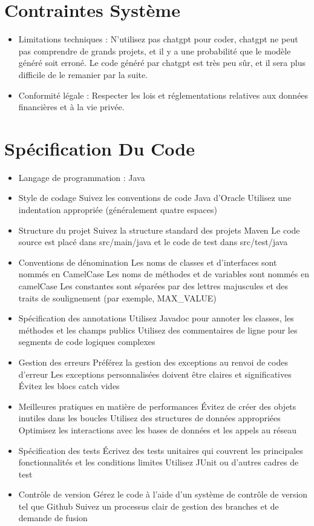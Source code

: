 \documentclass{article}
\begin{document}
\section{Contraintes Système}
\begin{itemize}
    \item Limitations techniques : N'utilisez pas chatgpt pour coder, chatgpt ne peut pas comprendre de grands projets, et il y a une probabilité que le modèle généré soit erroné. Le code généré par chatgpt est très peu sûr, et il sera plus difficile de le remanier par la suite.
    \item Conformité légale : Respecter les lois et réglementations relatives aux données financières et à la vie privée.
\end{itemize}
\section{Spécification Du Code}
\begin{itemize}
    \item Langage de programmation : Java
    \item Style de codage 
    \subitem Suivez les conventions de code Java d'Oracle
    \subitem Utilisez une indentation appropriée (généralement quatre espaces)
    \item Structure du projet
    \subitem Suivez la structure standard des projets Maven
    \subitem Le code source est placé dans src/main/java et le code de test dans src/test/java
    \item Conventions de dénomination
    \subitem Les noms de classes et d'interfaces sont nommés en CamelCase
    \subitem Les noms de méthodes et de variables sont nommés en camelCase
    \subitem Les constantes sont séparées par des lettres majuscules et des traits de soulignement (par exemple, MAX\_VALUE)
    \item Spécification des annotations
    \subitem Utilisez Javadoc pour annoter les classes, les méthodes et les champs publics
    \subitem Utilisez des commentaires de ligne pour les segments de code logiques complexes
    \item Gestion des erreurs
    \subitem Préférez la gestion des exceptions au renvoi de codes d'erreur
    \subitem Les exceptions personnalisées doivent être claires et significatives
    \subitem Évitez les blocs catch vides
    \item Meilleures pratiques en matière de performances
    \subitem Évitez de créer des objets inutiles dans les boucles
    \subitem Utilisez des structures de données appropriées
    \subitem Optimisez les interactions avec les bases de données et les appels au réseau
    \item Spécification des tests
    \subitem Écrivez des tests unitaires qui couvrent les principales fonctionnalités et les conditions limites
    \subitem Utilisez JUnit ou d'autres cadres de test
    \item Contrôle de version
    \subitem Gérez le code à l'aide d'un système de contrôle de version tel que Github
    \subitem Suivez un processus clair de gestion des branches et de demande de fusion
  
\end{itemize}
\end{document}
